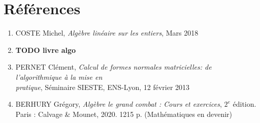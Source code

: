 \documentclass[11pt]{article}
\begin{document}

\section{Références}
\begin{enumerate}

	\item COSTE Michel, \textit{Algèbre linéaire sur les entiers}, Mars 2018
	\item \textbf{TODO livre algo}
	\item PERNET Clément, \textit{Calcul de formes normales matricielles: de
	l'algorithmique à la mise en \\pratique}, Séminaire SIESTE, ENS-Lyon, 12 février 2013
	\item BERHURY Grégory, \textit{Algèbre le grand combat : Cours et exercices}, $2^e$ édition.\\
	Paris : Calvage \& Mounet, 2020. 1215 p. (Mathématiques en devenir)
\end{enumerate}
\end{document}
